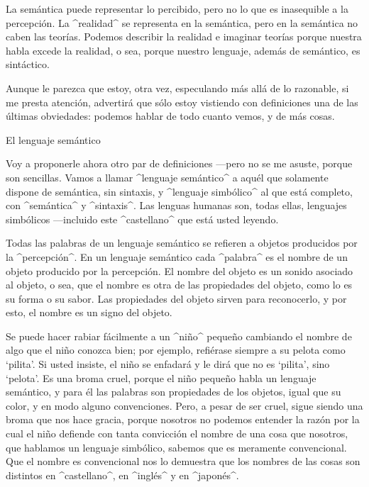 La semántica puede representar lo percibido, pero no lo que es
inasequible a la percepción. La ^realidad^ se representa en la
semántica, pero en la semántica no caben las teorías. Podemos describir
la realidad e imaginar teorías porque nuestra habla excede la realidad,
o sea, porque nuestro lenguaje, además de semántico, es sintáctico.

Aunque le parezca que estoy, otra vez, especulando más allá de lo
razonable, si me presta atención, advertirá que sólo estoy vistiendo con
definiciones una de las últimas obviedades: podemos hablar de todo
cuanto vemos, y de más cosas.


\Section El lenguaje semántico

Voy a proponerle ahora otro par de definiciones ---pero no se me asuste,
porque son sencillas. Vamos a llamar ^lenguaje semántico^ a aquél que
solamente dispone de semántica, sin sintaxis, y ^lenguaje simbólico^ al
que está completo, con ^semántica^ y ^sintaxis^. Las lenguas humanas
son, todas ellas, lenguajes simbólicos ---incluido este ^castellano^ que
está usted leyendo.

Todas las palabras de un lenguaje semántico se refieren a objetos
producidos por la ^percepción^. En un lenguaje semántico cada ^palabra^
es el nombre de un objeto producido por la percepción. El nombre del
objeto es un sonido asociado al objeto, o sea, que el nombre es otra de
las propiedades del objeto, como lo es su forma o su sabor. Las
propiedades del objeto sirven para reconocerlo, y por esto, el nombre es
un signo del objeto.

Se puede hacer rabiar fácilmente a un ^niño^ pequeño cambiando el nombre
de algo que el niño conozca bien; por ejemplo, refiérase siempre a su
pelota como `pilita'. Si usted insiste, el niño se enfadará y le dirá
que no es `pilita', sino `pelota'. Es una broma cruel, porque el niño
pequeño habla un lenguaje semántico, y para él las palabras son
propiedades de los objetos, igual que su color, y en modo alguno
convenciones. Pero, a pesar de ser cruel, sigue siendo una broma que nos
hace gracia, porque nosotros no podemos entender la razón por la cual el
niño defiende con tanta convicción el nombre de una cosa que nosotros,
que hablamos un lenguaje simbólico, sabemos que es meramente
convencional. Que el nombre es convencional nos lo demuestra que los
nombres de las cosas son distintos en ^castellano^, en ^inglés^ y en
^japonés^.


